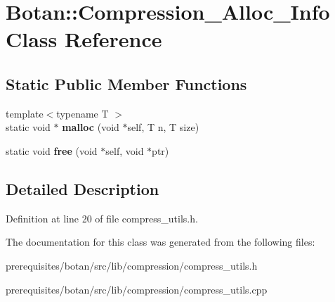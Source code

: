 \hypertarget{class_botan_1_1_compression___alloc___info}{}\section{Botan\+:\+:Compression\+\_\+\+Alloc\+\_\+\+Info Class Reference}
\label{class_botan_1_1_compression___alloc___info}
\subsection*{Static Public Member Functions}
\begin{DoxyCompactItemize}
\item 
\mbox{\label{class_botan_1_1_compression___alloc___info_aca5d02e903766b904572a92a86a8947f}} 
{\footnotesize template$<$typename T $>$ }\\static void $\ast$ {\bfseries malloc} (void $\ast$self, T n, T size)
\item 
\mbox{\label{class_botan_1_1_compression___alloc___info_a2da91af5586aaeedd2ede7e55eab9cc8}} 
static void {\bfseries free} (void $\ast$self, void $\ast$ptr)
\end{DoxyCompactItemize}


\subsection{Detailed Description}


Definition at line 20 of file compress\+\_\+utils.\+h.



The documentation for this class was generated from the following files\+:\begin{DoxyCompactItemize}
\item 
prerequisites/botan/src/lib/compression/compress\+\_\+utils.\+h\item 
prerequisites/botan/src/lib/compression/compress\+\_\+utils.\+cpp\end{DoxyCompactItemize}
